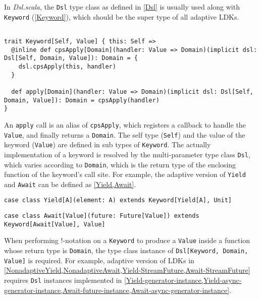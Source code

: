 In \textit{Dsl.scala}, the \lstinline{Dsl} type class as defined in \cref{Dsl} is usually used along with \lstinline{Keyword} (\cref{Keyword}), which should be the super type of all adaptive LDKs.

\begin{lstlisting}[caption={\lstinline{Keyword}, the super type of all adaptive LDKs},label={Keyword}]

trait Keyword[Self, Value] { this: Self =>
  @inline def cpsApply[Domain](handler: Value => Domain)(implicit dsl: Dsl[Self, Domain, Value]): Domain = {
    dsl.cpsApply(this, handler)
  }

  def apply[Domain](handler: Value => Domain)(implicit dsl: Dsl[Self, Domain, Value]): Domain = cpsApply(handler)
}
\end{lstlisting}

An \lstinline{apply} call is an alias of \lstinline{cpsApply}, which registers a callback to handle the \lstinline{Value}, and finally returns a \lstinline{Domain}. The self type (\lstinline{Self}) and the value of the keyword (\lstinline{Value}) are defined in sub types of \lstinline{Keyword}. The actually implementation of a keyword is resolved by the multi-parameter type class \lstinline{Dsl}, which varies according to \lstinline{Domain}, which is the return type of the enclosing function of the keyword's call site. For example, the adaptive version of \lstinline{Yield} and \lstinline{Await} can be defined as \cref{Yield,Await}.

\begin{lstlisting}[caption={The \lstinline{Yield} LDK, the adaptive version},label={Yield}]
case class Yield[A](element: A) extends Keyword[Yield[A], Unit]
\end{lstlisting}

\begin{lstlisting}[caption={The \lstinline{Await} LDK, the adaptive version},label={Await}]
case class Await[Value](future: Future[Value]) extends Keyword[Await[Value], Value]
\end{lstlisting}

When performing !-notation on a \lstinline{Keyword} to produce a \lstinline{Value} inside a function whose return type is \lstinline{Domain}, the type class instance of \lstinline{Dsl[Keyword, Domain, Value]} is required. For example, adaptive version of LDKs in \cref{NonadaptiveYield,NonadaptiveAwait,Yield-StreamFuture,Await-StreamFuture} requires \lstinline{Dsl} instances implemented in \cref{Yield-generator-instance,Yield-async-generator-instance,Await-future-instance,Await-async-generator-instance}.

